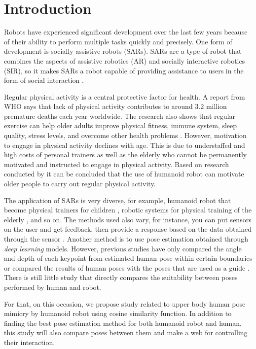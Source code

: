 \section{Introduction}
\label{sec:introduction}


Robots have experienced significant development over the last few years 
because of their ability to perform multiple tasks quickly and precisely.
One form of development is socially assistive robots (SARs). 
SARs are a type of robot that combines the aspects of assistive robotics (AR)
and socially interactive robotics (SIR), so it makes SARs a robot capable of providing assistance to users in the form of social interaction \citep{feil2005}.

Regular physical activity is a central protective factor for health.
A report from WHO says that lack of physical activity contributes to around 3.2 million premature deaths each year worldwide.
The research also shows that regular exercise can help older adults improve physical fitness, immune system, sleep quality, stress levels, and overcome other health problems \citep{lotfi2018}.
However, motivation to engage in physical activity declines with age. 
This is due to understaffed and high costs of personal trainers as well as the elderly who cannot be permanently motivated and instructed to engage in physical activity.
Based on research conducted by \citet{ruf2020} it can be concluded that the use of humanoid robot can motivate older people to carry out regular physical activity.

The application of SARs is very diverse, for example, humanoid robot that become physical trainers for children \citep{güneysu2017}, 
robotic systems for physical training of the elderly \citep{avioz2021}, and so on. The methods used also vary, for instance, 
you can put sensors on the user and get feedback, then provide a response based on the data obtained through the sensor \citep{güneysu2017}. 
Another method is to use pose estimation obtained through \emph{deep learning} models.
However, previous studies have only compared the angle and depth of each keypoint from estimated human pose within certain boundaries or compared the results of human poses with the poses that are used as a guide \citep{romeo}.
There is still little study that directly compares the suitability between poses performed by human and robot.

For that, on this occasion, we propose study related to upper body human pose mimicry by humanoid robot using cosine similarity function. 
In addition to finding the best pose estimation method for both humanoid robot and human, this study will also compare poses between them and make a web for controlling their interaction.
